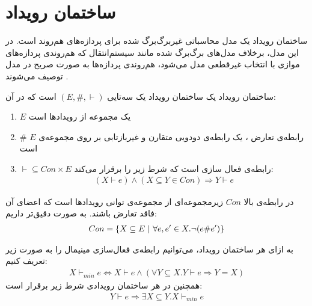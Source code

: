 \section{ساختمان رویداد}
ساختمان رویداد
\cite{es}
یک مدل محاسباتی
غیر‌برگ‌برگ شده
برای پردازه‌های هم‌روند
است.
در این مدل، برخلاف مدل‌های برگ‌برگ شده
مانند سیستم‌انتقال که هم‌روندی پردازه‌های موازی با انتخاب غیرقطعی مدل می‌شود، هم‌روندی پردازه‌ها به صورت صریح در مدل توصیف می‌شوند
\cite{sassone1996models}.
\begin{definition}{ساختمان رویداد}
    یک ساختمان رویداد یک سه‌تایی
    $(E,\#,\vdash)$
    است که در آن:
    \begin{enumerate}
        \item $E$
              یک مجموعه از رویداد‌ها است
        \item $\#$
              رابطه‌ی تعارض
              ، یک رابطه‌ی دودویی متقارن و غیربازتابی بر روی مجموعه‌ی
              $E$
              است
        \item $\vdash \subseteq Con \times E$
              رابطه‌ی فعال سازی
              است که شرط زیر را برقرار می‌کند:
              \begin{align*}
                  (X \vdash e) \wedge (X \subseteq Y \in Con)
                  \Rightarrow Y \vdash e
              \end{align*}
    \end{enumerate}
    در رابطه‌ی بالا
    $Con$
    زیرمجموعه‌ای از مجموعه‌ی توانی رویدادها است که اعضای آن فاقد تعارض باشند.
    به صورت دقیق‌تر داریم:
    \begin{align*}
        Con = \{X \subseteq E ~|~ \forall e,e' \in X. \neg(e\#e')\}
    \end{align*}
\end{definition}
\begin{definition}
    به ازای هر ساختمان رویداد، می‌توانیم رابطه‌ی فعال‌سازی مینیمال را به صورت زیر تعریف کنیم:
    \begin{align*}
        X \vdash_{min} e \iff X \vdash e \wedge
        ( \forall Y \subseteq X . Y \vdash e \Rightarrow Y = X )
    \end{align*}
    همچنین در هر ساختمان رویدادی شرط زیر برقرار است:
    \begin{align*}
        Y \vdash e \Rightarrow \exists X \subseteq Y . X \vdash_{min} e
    \end{align*}
\end{definition}


